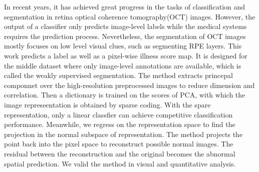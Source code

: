 
\begin{eabstract}
  In recent years, it has achieved great progress in the tasks of classification and segmentation in retina optical coherence tomography(OCT) images. However, the output of a classifier only predicts image-level labels while the medical systems requires the prediction process. Nevertheless, the segmentation of OCT images mostly focuses on low level visual clues, such as segmenting RPE layers. This work predicts a label as well as a pixel-wise illness score map. It is designed for the middle dataset where only image-level annotations are available, which is called the weakly supervised segmentation. The method extracts princepal componnet over the high-resolution preprocessed images to reduce dimension and correlation.  Then a dictionary is trained on the scores of PCA,  with which the image represeentation is obtained by sparse coding. With the spare representation, only a linear classfier can achieve competitive classification  performance. Meanwhile, we regress on the representation space to find the projection in the normal subspace of representation. The method projects the point back into the pixel space to reconstruct possible normal images. The residual between the reconstruction and the original becomes the abnormal spatial prediction. We valid the method in visual and quantitative analysis.

\end{eabstract}

